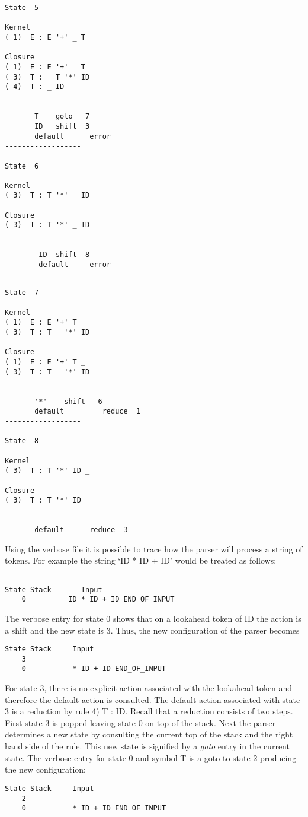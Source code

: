 \newpage
\begin{verbatim}
State  5

Kernel
( 1)  E : E '+' _ T

Closure
( 1)  E : E '+' _ T
( 3)  T : _ T '*' ID
( 4)  T : _ ID


       T    goto   7
       ID   shift  3
       default      error
------------------

State  6

Kernel
( 3)  T : T '*' _ ID

Closure
( 3)  T : T '*' _ ID


        ID  shift  8
        default     error
------------------
\end{verbatim}
\newpage
\begin{verbatim}
State  7

Kernel
( 1)  E : E '+' T _
( 3)  T : T _ '*' ID

Closure
( 1)  E : E '+' T _
( 3)  T : T _ '*' ID


       '*'    shift   6
       default         reduce  1
------------------

State  8

Kernel
( 3)  T : T '*' ID _

Closure
( 3)  T : T '*' ID _


       default      reduce  3

\end{verbatim}

Using the verbose file it is possible to trace how the parser will
process a string of tokens.  For example the string `ID * ID + ID' would
be treated as follows:
\begin{verbatim}

State Stack       Input
    0          ID * ID + ID END_OF_INPUT
\end{verbatim}
The verbose entry for state 0 shows that on a lookahead token of
ID the action is a shift and the new state is 3.  Thus, the new
configuration of the parser becomes

\begin{verbatim}
State Stack     Input
    3
    0           * ID + ID END_OF_INPUT

\end{verbatim}

For state 3, there is no explicit action associated with the lookahead
token and therefore the default action is consulted.  The default
action associated
with state 3 is a reduction by rule 4) T : ID.  Recall that a reduction
consists of two steps.  First state 3 is popped leaving state 0
on top of the stack.  Next the parser determines a new state
by consulting the current top of
the stack and the right hand side of the rule.  This new state is
signified by a
{\it goto}
entry in the current state.  The verbose entry
for state 0 and symbol T is a goto to state 2 producing the
new configuration:
\begin{verbatim}
State Stack     Input
    2
    0           * ID + ID END_OF_INPUT

\end{verbatim}

